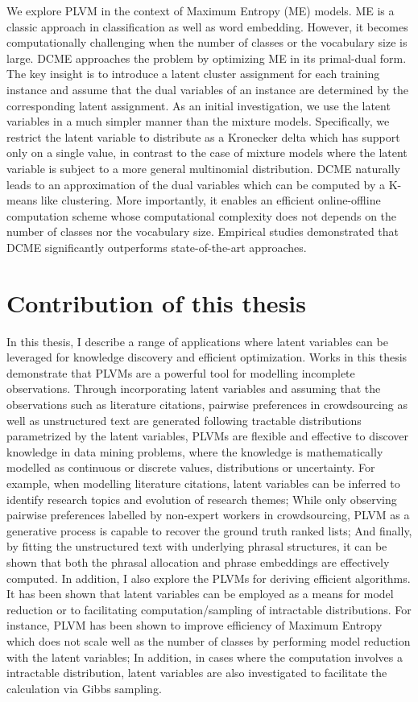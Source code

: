 We explore PLVM in the context of Maximum Entropy (ME) models. ME is a classic
approach in classification as well as word embedding. However, it becomes
computationally challenging when the number of classes or the vocabulary size is
large. DCME approaches the problem by optimizing ME in its primal-dual form. The
key insight is to introduce a latent cluster assignment for each training
instance and assume that the dual variables of an instance are determined by the
corresponding latent assignment. As an initial investigation, we use the latent
variables in a much simpler manner than the mixture models. Specifically, we
restrict the latent variable to distribute as a Kronecker delta which has
support only on a single value, in contrast to the case of mixture models where
the latent variable is subject to a more general multinomial distribution. DCME
naturally leads to an approximation of the dual variables which can be computed
by a K-means like clustering. More importantly, it enables an efficient
online-offline computation scheme whose computational complexity does not
depends on the number of classes nor the vocabulary size. Empirical studies
demonstrated that DCME significantly outperforms state-of-the-art approaches.

\section{Contribution of this thesis}

In this thesis, I describe a range of applications where latent variables can be
leveraged for knowledge discovery and efficient optimization. Works in this
thesis demonstrate that PLVMs are a powerful tool for modelling incomplete
observations. Through incorporating latent variables and assuming that the
observations such as literature citations, pairwise preferences in crowdsourcing
as well as unstructured text are generated following tractable distributions
parametrized by the latent variables, PLVMs are flexible and effective to
discover knowledge in data mining problems, where the knowledge is
mathematically modelled as continuous or discrete values, distributions or
uncertainty. For example, when modelling literature citations, latent variables
can be inferred to identify research topics and evolution of research themes;
While only observing pairwise preferences labelled by non-expert workers in
crowdsourcing, PLVM as a generative process is capable to recover the ground
truth ranked lists; And finally, by fitting the unstructured text with
underlying phrasal structures, it can be shown that both the phrasal allocation
and phrase embeddings are effectively computed. In addition, I also explore the
PLVMs for deriving efficient algorithms. It has been shown that latent variables
can be employed as a means for model reduction or to facilitating
computation/sampling of intractable distributions. For instance, PLVM has been
shown to improve efficiency of Maximum Entropy which does not scale well as the
number of classes by performing model reduction with the latent variables; In
addition, in cases where the computation involves a intractable distribution,
latent variables are also investigated to facilitate the calculation via Gibbs
sampling.

